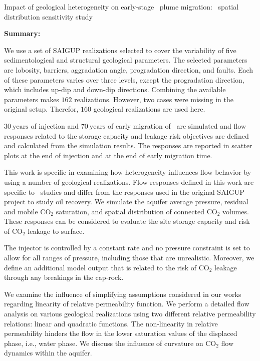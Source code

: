 {Impact of geological heterogeneity on early-stage \coo\ plume migration: \coo\
spatial distribution sensitivity study}
{
\textbf{Summary:}

We use a set of SAIGUP realizations selected to cover the variability of five
sedimentological and structural geological parameters. The selected parameters are
lobosity, barriers, aggradation angle, progradation direction, and faults. Each
of these parameters varies over three levels, except the progradation direction,
which includes up-dip and down-dip directions. Combining the available 
parameters makes $162$ realizations. However, two cases were missing in the original setup. Therefor, $160$ geological realizations are used here.

$30~\mbox{years}$ of injection and $70~\mbox{years}$ of early migration of \coo\ are simulated and flow responses related to the storage
capacity and leakage risk objectives are defined and calculated from
the simulation results. The responses are reported in scatter plots at the end of
injection and at the end of early migration time. 

This work is specific in examining how heterogeneity influences flow behavior
by using a number of geological realizations. Flow responses defined in
this work are specific to \coo\ studies and differ from the responses
used in the original SAIGUP project to study oil recovery. We simulate the
aquifer average pressure, residual and mobile CO$_2$
saturation, and spatial distribution of connected CO$_2$ volumes. These
responses can be considered to evaluate the site storage capacity and risk of
CO$_2$ leakage to surface. 

The injector is controlled by a constant rate and no pressure constraint is set
to allow for all ranges of pressure, including those that are unrealistic.
Moreover, we define an additional model output that is related to the risk of
CO$_2$ leakage through any breakings in the cap-rock.

We examine the influence of simplifying assumptions considered in our works
regarding linearity of relative permeability function. We perform a detailed
flow analysis on various geological realizations using two different relative
permeability relations: linear and quadratic functions. The non-linearity in
relative permeability hinders the flow in the lower saturation values of the
displaced phase, i.e., water phase. We discuss the influence of curvature on
$\mbox{CO}_2$ flow dynamics within the aquifer. 

}
